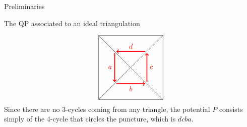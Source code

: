 \begin{chapter}{Preliminaries}
\begin{section}{The QP associated to an ideal triangulation}
\begin{exmp}
\[\begin{tikzpicture}[scale=0.8]
\draw (-2,-2) to (-2,2);
\draw (-2,2) to (2,2);
\draw (2,2) to (2,-2);
\draw (2,-2) to (-2,-2);
\draw (-2,-2) to (2,2);
\draw (-2,2) to (2,-2);
\draw[->, red, very thick] (-1,0.9) to node[left] {$a$} (-1, -0.9);
\draw[->, red, very thick] (-0.9,-1) to node[below] {$b$} (0.9, -1);
\draw[->, red, very thick] (1,-0.9) to node[right] {$c$} (1, 0.9);
\draw[->, red, very thick] (0.9, 1) to node[above] {$d$} (-0.9, 1);
\end{tikzpicture}
\]
Since there are no 3-cycles coming from any triangle, the potential $P$ consists simply of the 4-cycle that circles the puncture, which is $dcba$.
\end{exmp}
\end{section}
\end{chapter}